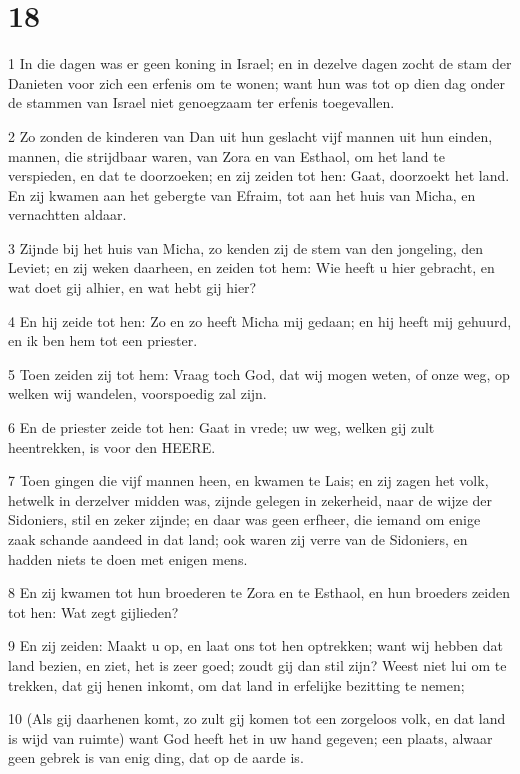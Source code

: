 \chapter{18}

\par 1 In die dagen was er geen koning in Israel; en in dezelve dagen zocht de stam der Danieten voor zich een erfenis om te wonen; want hun was tot op dien dag onder de stammen van Israel niet genoegzaam ter erfenis toegevallen.
\par 2 Zo zonden de kinderen van Dan uit hun geslacht vijf mannen uit hun einden, mannen, die strijdbaar waren, van Zora en van Esthaol, om het land te verspieden, en dat te doorzoeken; en zij zeiden tot hen: Gaat, doorzoekt het land. En zij kwamen aan het gebergte van Efraim, tot aan het huis van Micha, en vernachtten aldaar.
\par 3 Zijnde bij het huis van Micha, zo kenden zij de stem van den jongeling, den Leviet; en zij weken daarheen, en zeiden tot hem: Wie heeft u hier gebracht, en wat doet gij alhier, en wat hebt gij hier?
\par 4 En hij zeide tot hen: Zo en zo heeft Micha mij gedaan; en hij heeft mij gehuurd, en ik ben hem tot een priester.
\par 5 Toen zeiden zij tot hem: Vraag toch God, dat wij mogen weten, of onze weg, op welken wij wandelen, voorspoedig zal zijn.
\par 6 En de priester zeide tot hen: Gaat in vrede; uw weg, welken gij zult heentrekken, is voor den HEERE.
\par 7 Toen gingen die vijf mannen heen, en kwamen te Lais; en zij zagen het volk, hetwelk in derzelver midden was, zijnde gelegen in zekerheid, naar de wijze der Sidoniers, stil en zeker zijnde; en daar was geen erfheer, die iemand om enige zaak schande aandeed in dat land; ook waren zij verre van de Sidoniers, en hadden niets te doen met enigen mens.
\par 8 En zij kwamen tot hun broederen te Zora en te Esthaol, en hun broeders zeiden tot hen: Wat zegt gijlieden?
\par 9 En zij zeiden: Maakt u op, en laat ons tot hen optrekken; want wij hebben dat land bezien, en ziet, het is zeer goed; zoudt gij dan stil zijn? Weest niet lui om te trekken, dat gij henen inkomt, om dat land in erfelijke bezitting te nemen;
\par 10 (Als gij daarhenen komt, zo zult gij komen tot een zorgeloos volk, en dat land is wijd van ruimte) want God heeft het in uw hand gegeven; een plaats, alwaar geen gebrek is van enig ding, dat op de aarde is.
